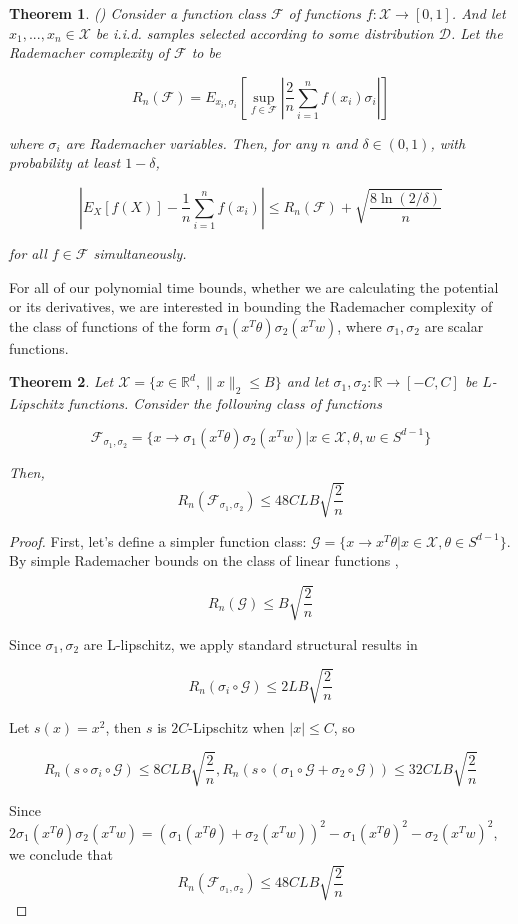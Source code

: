 \documentclass[11pt]{article}
\newtheorem{theorem}{Theorem}[section]
\newcommand{\R}{{\mathbb{R}}}
\begin{document}
\begin{theorem} (\cite{bartlett2002rademacher}) Consider a function class $\mathcal{F}$ of functions $f : \mathcal{X} \to [0,1]$. And let $ x_1,...,x_n \in \mathcal{X}$ be i.i.d. samples selected according to some distribution $\mathcal{D}$. Let the Rademacher complexity of $\mathcal{F}$ to be 

\[R_n (\mathcal{F}) = E_{x_i,\sigma_i}\left[\sup_{f \in \mathcal{F}} \left|\frac{2}{n}\sum_{i=1}^nf(x_i)\sigma_i\right|\right]\]

where $\sigma_i$ are Rademacher variables. Then, for any $n$ and $\delta \in (0,1)$, with probability at least $1-\delta$, 


\[|E_{X}[f(X)]  - \frac{1}{n}\sum_{i=1}^n f(x_i)| \leq R_n(\mathcal{F}) + \sqrt{\frac{8\ln(2/\delta)}{n}} \]

for all $f \in\mathcal{F}$ simultaneously.
\end{theorem}

For all of our polynomial time bounds, whether we are calculating the potential or its derivatives, we are interested in bounding the Rademacher complexity of the class of functions of the form $\sigma_1(x^T\theta) \sigma_2(x^Tw)$, where $\sigma_1,\sigma_2$ are scalar functions.




\begin{theorem}
Let $\mathcal{X} = \{x \in \R^d, \|x\|_2\leq B\}$ and let $\sigma_1,\sigma_2 : \R \to [-C,C]$ be $L$-Lipschitz functions. Consider the following class of functions

\[\mathcal{F}_{\sigma_1,\sigma_2} = \{x\to\sigma_1(x^T\theta) \sigma_2(x^Tw) | x\in\mathcal{X}, \theta, w \in S^{d-1}\}\]

Then, \[R_n(\mathcal{F}_{\sigma_1,\sigma_2}) \leq 48CLB\sqrt{\frac{2}{n}}\]

\end{theorem}

\begin{proof}
First, let's define a simpler function class: $\mathcal{G} = \{x\to x^T\theta  | x\in\mathcal{X}, \theta \in S^{d-1}\}$. By simple Rademacher bounds on the class of linear functions \cite{kakade2009complexity}, 
 
 \[R_n(\mathcal{G}) \leq B\sqrt{\frac{2}{n}}\]
 
Since $\sigma_1,\sigma_2$ are L-lipschitz, we apply standard structural results in \cite{bartlett2002rademacher}

\[R_n(\sigma_i\circ \mathcal{G}) \leq 2LB\sqrt{\frac{2}{n}}\]

Let $s(x) = x^2$, then $s$ is $2C$-Lipschitz when $|x|\leq C$, so 

\[R_n(s\circ \sigma_i\circ\mathcal{G}) \leq 8CLB\sqrt{\frac{2}{n}}, R_n(s\circ(\sigma_1\circ \mathcal{G} +\sigma_2\circ \mathcal{G})) \leq 32 CLB\sqrt{\frac{2}{n}}\]
 
Since $2\sigma_1(x^T\theta)\sigma_2(x^Tw) = (\sigma_1(x^T\theta)+\sigma_2(x^Tw))^2 - \sigma_1(x^T\theta)^2 - \sigma_2(x^Tw)^2$, we conclude that 
\[R_n (\mathcal{F}_{\sigma_1,\sigma_2}) \leq 48CLB\sqrt{\frac{2}{n}}\]
\end{proof}
\end{document}
